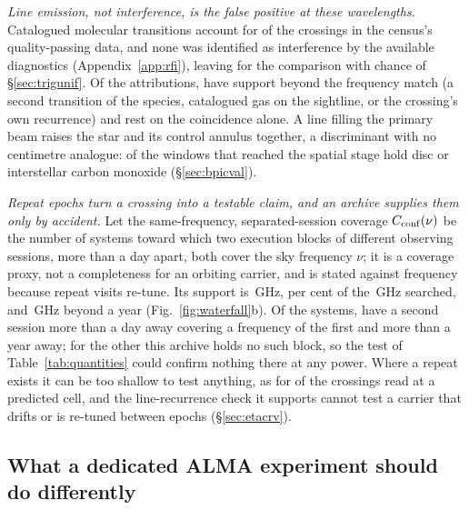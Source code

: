 \emph{Line emission, not interference, is the false positive at these
wavelengths.} Catalogued molecular transitions account for \CsNAttrQp{} of the
\CsNCrossQp{} crossings in the census's quality-passing data, and none was
identified as interference by the available diagnostics (Appendix~\ref{app:rfi}), leaving \CsNUnattrQp{} for the comparison
with chance of \S\ref{sec:trigunif}. Of the attributions, \LnAttrSupp{} have
support beyond the frequency match (a second transition of the species,
catalogued gas on the sightline, or the crossing's own recurrence) and
\LnAttrCoincWord{} rest on the coincidence alone. A line filling the primary beam raises the star
and its control annulus together, a discriminant with no centimetre analogue:
\DiscFpWin{} of the \DiscFpOfFlags{} windows that reached the spatial stage
hold disc or interstellar carbon monoxide (\S\ref{sec:bpicval}).

\emph{Repeat epochs turn a crossing into a testable claim, and an archive
supplies them only by accident.} Let the same-frequency, separated-session
coverage $C_{\rm conf}(\nu)$ be the number of systems toward which two
execution blocks of different observing sessions, more than a day apart, both
cover the sky frequency $\nu$; it is a coverage proxy, not a completeness for
an orbiting carrier, and is stated against frequency because repeat visits
re-tune.
Its support is \CvConfGHzDay\,GHz, \CvConfPctDay{} per cent of the
\CvUnionA\,GHz searched, and \CvConfGHzYr\,GHz beyond a year
(Fig.~\ref{fig:waterfall}b). Of the \NSysClassA{} systems, \ZcConfSysDay{} have
a second session more than a day away covering a frequency of the first and
\ZcConfSysYr{} more than a year away; for the other \ZcNoRepSys{} this archive
holds no such block, so the test of Table~\ref{tab:quantities} could confirm
nothing there at any power. Where a repeat exists it can be too
shallow to test anything, as for \HjNPowerLo{} of the \RcNExcl{} crossings read
at a predicted cell, and the line-recurrence check it supports cannot test a
carrier that drifts or is re-tuned between epochs (\S\ref{sec:etacrv}).

\subsection{What a dedicated ALMA experiment should do differently}
\label{sec:future}

